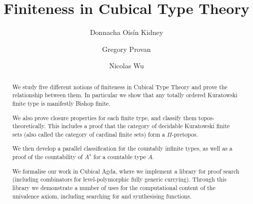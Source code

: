 



\title{Finiteness in Cubical Type Theory}

\author{Donnacha Oisín Kidney}
\author{Gregory Provan}
\author{Nicolas Wu}

\begin{abstract}
  We study five different notions of finiteness in Cubical Type Theory and prove
  the relationship between them.
  In particular we show that any totally ordered Kuratowski finite type is
  manifestly Bishop finite.

  We also prove closure properties for each finite type, and classify them
  topos-theoretically.
  This includes a proof that the category of decidable Kuratowski finite sets
  (also called the category of cardinal finite sets) form a \(\Pi\)-pretopos.

  We then develop a parallel classification for the countably infinite types, as
  well as a proof of the countability of \(A^\star\) for a countable type \(A\).

  We formalise our work in Cubical Agda, where we implement a library for proof
  search (including combinators for level-polymorphic fully generic currying).
  Through this library we demonstrate a number of uses for the computational
  content of the univalence axiom, including searching for and synthesising
  functions.
\end{abstract}


\maketitle









 